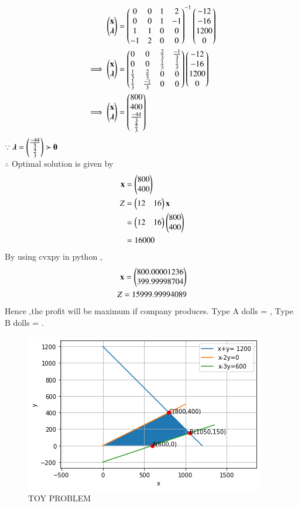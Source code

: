 \documentclass[journal,12pt,twocolumn]{IEEEtran}
\begin{document}
\begin{align}
    \begin{pmatrix}\mathbf{x} \\ \boldsymbol{\lambda}\end{pmatrix} &= \begin{pmatrix}0 & 0 & 1 & 2 \\ 0 & 0 & 1 & -1 \\ 1 & 1 & 0 & 0 \\ -1 & 2 & 0 & 0\end{pmatrix}^{-1}\begin{pmatrix}-12 \\ -16 \\ 1200 \\ 0\end{pmatrix}
    \\
    \implies   \begin{pmatrix}\mathbf{x} \\ \boldsymbol{\lambda}\end{pmatrix} &= \begin{pmatrix}0 & 0 & \frac{2}{3} & \frac{-1}{3} \\ 0 & 0 & \frac{1}{3} & \frac{1}{3} \\ \frac{1}{3} & \frac{2}{3} & 0 & 0 \\ \frac{1}{3} & \frac{-1}{3} & 0 & 0\end{pmatrix}\begin{pmatrix}-12 \\ -16 \\ 1200 \\ 0\end{pmatrix}
    \\
    \implies \begin{pmatrix}\mathbf{x} \\ \boldsymbol{\lambda}\end{pmatrix} &= \begin{pmatrix}800 \\ 400 \\ \frac{-44}{3} \\ \frac{4}{3} \end{pmatrix}
\end{align}
$\because \boldsymbol{\lambda}=\begin{pmatrix}\frac{-44}{3} \\ \frac{4}{3}\end{pmatrix} \succ \mathbf{0}$ 
\\
$\therefore$ Optimal solution is given by
\begin{align}
    \mathbf{x} &= \begin{pmatrix}800\\400\end{pmatrix} \\
    Z &= \begin{pmatrix}12 & 16\end{pmatrix}\mathbf{x} \\
    &= \begin{pmatrix}12 & 16\end{pmatrix}\begin{pmatrix}800 \\ 400\end{pmatrix} \\
    &= 16000
\end{align}
By using cvxpy in python ,
\begin{align}
    \mathbf{x}=\begin{pmatrix}800.00001236\\399.99998704\end{pmatrix}\\
    Z = 15999.99994089
\end{align}
Hence ,the profit will be maximum if company produces.
Type A dolls = ,
Type B dolls = .
\begin{figure}[H]
\centering
\includegraphics[width=\columnwidth]{download.png}
\caption{TOY PROBLEM}
\label{fig:TOY PROBLEM}	
\end{figure}
\end{document}
